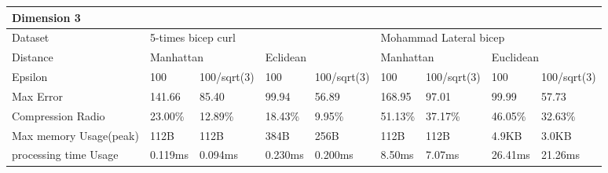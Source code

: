 \documentclass[10pt, conference, compsocconf]{IEEEtran}
\begin{document}
\begin{table}[]
    \begin{tabular}{|l|l|l|l|l|l|l|l|l|}
    \hline
    \multicolumn{9}{|l|}{Dimension 3}                                                                                                                         \\ \hline
    Dataset                & \multicolumn{4}{l|}{5-times bicep curl}                        & \multicolumn{4}{l|}{Mohammad Lateral bicep}                     \\ \hline
    Distance               & \multicolumn{2}{l|}{Manhattan} & \multicolumn{2}{l|}{Eclidean} & \multicolumn{2}{l|}{Manhattan} & \multicolumn{2}{l|}{Euclidean} \\ \hline
    Epsilon                & 100          & 100/sqrt(3)     & 100         & 100/sqrt(3)     & 100        & 100/sqrt(3)       & 100        & 100/sqrt(3)       \\ \hline
    Max Error              & 141.66       & 85.40           & 99.94       & 56.89           & 168.95     & 97.01             & 99.99      & 57.73             \\ \hline
    Compression Radio      & 23.00\%      & 12.89\%         & 18.43\%     & 9.95\%          & 51.13\%    & 37.17\%           & 46.05\%    & 32.63\%           \\ \hline
    Max memory Usage(peak) & 112B         & 112B            & 384B        & 256B            & 112B       & 112B              & 4.9KB      & 3.0KB             \\ \hline
    processing time Usage  & 0.119ms      & 0.094ms         & 0.230ms     & 0.200ms         & 8.50ms     & 7.07ms            & 26.41ms    & 21.26ms           \\ \hline
    \end{tabular}
\end{table}




\end{document}
